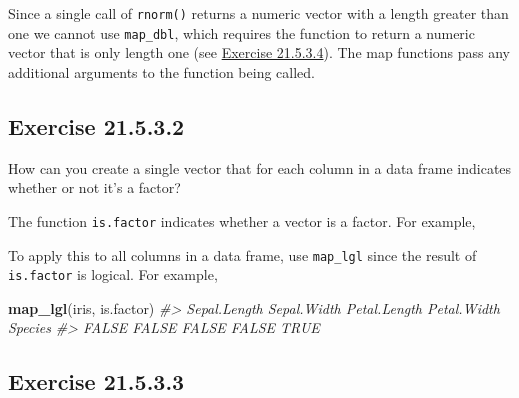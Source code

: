 \documentclass[]{book}
\newenvironment{Shaded}{\begin{snugshade}}{\end{snugshade}}
\newcommand{\CommentTok}[1]{\textcolor[rgb]{0.56,0.35,0.01}{\textit{#1}}}
\newcommand{\KeywordTok}[1]{\textcolor[rgb]{0.13,0.29,0.53}{\textbf{#1}}}
\newcommand{\NormalTok}[1]{#1}
\newcommand{\OperatorTok}[1]{\textcolor[rgb]{0.81,0.36,0.00}{\textbf{#1}}}
\theoremstyle{plain}
\theoremstyle{remark}
\begin{document}
\begin{enumerate}
  Since a single call of \texttt{rnorm()} returns a numeric vector with a length greater
  than one we cannot use \texttt{map\_dbl}, which requires the function to return a numeric
  vector that is only length one (see \protect\hyperlink{exercise-21.5.3.4}{Exercise 21.5.3.4}).
  The map functions pass any additional arguments to the function being called.
\end{enumerate}

\hypertarget{exercise-21.5.3.2}{%
\subsection*{\texorpdfstring{Exercise {21.5.3.2}}{Exercise 21.5.3.2}}\label{exercise-21.5.3.2}}

How can you create a single vector that for each column in a data frame indicates whether or not it's a factor?

The function \texttt{is.factor} indicates whether a vector is a factor. For example,

\begin{Shaded}
\end{Shaded}

To apply this to all columns in a data frame, use \texttt{map\_lgl} since the result
of \texttt{is.factor} is logical. For example,

\begin{Shaded}
\begin{Highlighting}[]
\KeywordTok{map_lgl}\NormalTok{(iris, is.factor)}
\CommentTok{#> Sepal.Length  Sepal.Width Petal.Length  Petal.Width      Species }
\CommentTok{#>        FALSE        FALSE        FALSE        FALSE         TRUE}
\end{Highlighting}
\end{Shaded}

\hypertarget{exercise-21.5.3.3}{%
\subsection*{\texorpdfstring{Exercise {21.5.3.3}}{Exercise 21.5.3.3}}\label{exercise-21.5.3.3}}
\end{document}

